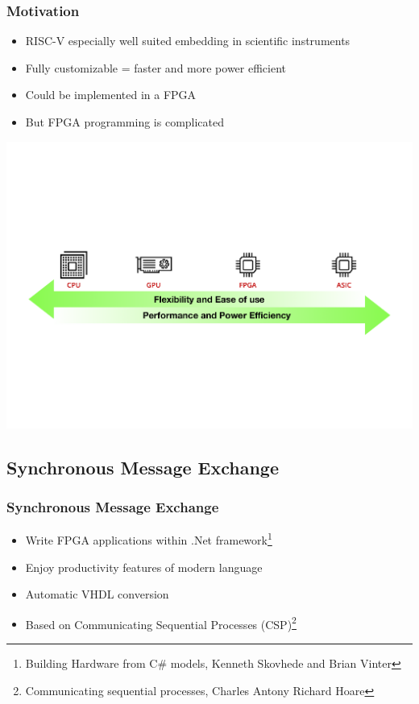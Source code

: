 \documentclass{beamer}
\begin{document}
    \begin{frame}
        \frametitle{Motivation}
        \begin{itemize}
            \item RISC-V especially well suited embedding in scientific instruments
            \item Fully customizable = faster and more power efficient  
            \item Could be implemented in a FPGA 
            \item But FPGA programming is complicated
        \end{itemize}
        
        \centering
        \vspace{1cm}
        \includegraphics[scale=0.35]{"Pictures and plots/tradeoffs_own"}
        
    \end{frame}

	\begin{frame}
        \subsection{Synchronous Message Exchange}
		\frametitle{Synchronous Message Exchange}
        
		\begin{itemize}
            \item Write FPGA applications within .Net framework\footnote{\tiny Building Hardware from C$\#$ models, Kenneth Skovhede and Brian Vinter}
            \item Enjoy productivity features of modern language
            \item Automatic VHDL conversion
            \item Based on Communicating Sequential Processes (CSP)\footnote{\vspace{0.5cm}\tiny Communicating sequential processes, Charles Antony Richard Hoare}
        \end{itemize}

	\end{frame}
\end{document}

